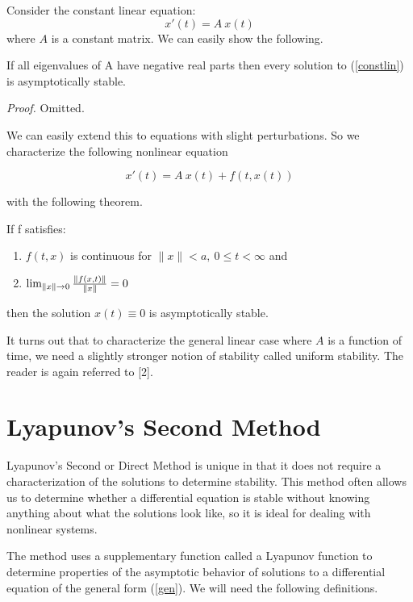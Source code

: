 \documentclass[12pt]{article}
\def\pf{{\em Proof. }}
\begin{document}
Consider the constant linear equation:
\begin{equation}
	x'(t) = A \ x(t)
	\label{constlin}
\end{equation}
where $A$ is a constant matrix.  We can easily show the following.

\begin{thm}
	If all eigenvalues of A have negative real parts then every
solution to (\ref{constlin}) is asymptotically stable.
\end{thm}

\pf Omitted.

We can easily extend this to equations with slight perturbations.  So
we characterize the following nonlinear equation

\begin{equation}
	x'(t) = A \ x(t) + f(t,x(t))
	\label{nonlinear}
\end{equation}

with the following theorem.

\begin{thm}
	If f satisfies:

\begin{enumerate}
\item $f(t,x)$ is continuous for $\| x \| < a, \ 0 \le t <\infty$ and
\item $\lim_{\| x \| \rightarrow 0} {\| f(x,t) \| \over \| x \|} = 0$ 
\end{enumerate}
then the solution $x(t) \equiv 0$ is asymptotically stable.
\end{thm}

It turns out that to characterize the general linear case where $A$ is a
function of time, we need a slightly stronger notion of stability
called uniform stability.  The reader is again referred to [2].

\section{Lyapunov's Second Method}

Lyapunov's Second or Direct Method is unique in that it does not
require a characterization of the solutions to determine stability.
This method often allows us to determine whether a differential
equation is stable without knowing anything about what the solutions
look like, so it is ideal for dealing with nonlinear systems.

The method uses a supplementary function called a Lyapunov function to
determine properties of the asymptotic behavior of solutions to a
differential equation of the general form (\ref{gen}).  We will need
the following definitions.
\end{document}
